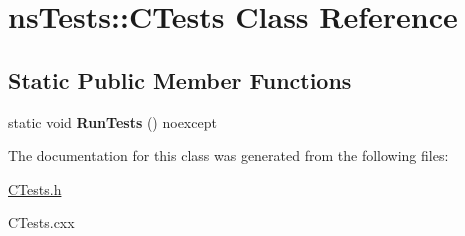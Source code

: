\hypertarget{classnsTests_1_1CTests}{\section{ns\+Tests\+:\+:C\+Tests Class Reference}
\label{classnsTests_1_1CTests}
}
\subsection*{Static Public Member Functions}
\begin{DoxyCompactItemize}
\item 
\hypertarget{classnsTests_1_1CTests_aae66713c9bfd5986c8321a954cf1b023}{static void {\bfseries Run\+Tests} () noexcept}\label{classnsTests_1_1CTests_aae66713c9bfd5986c8321a954cf1b023}

\end{DoxyCompactItemize}


The documentation for this class was generated from the following files\+:\begin{DoxyCompactItemize}
\item 
\hyperlink{CTests_8h}{C\+Tests.\+h}\item 
C\+Tests.\+cxx\end{DoxyCompactItemize}
